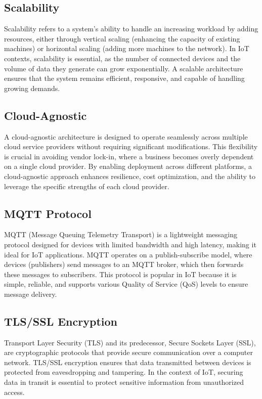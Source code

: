 \subsection*{Scalability}
\label{sec:scalability}
Scalability refers to a system's ability to handle an increasing workload by adding resources, either through vertical scaling (enhancing the capacity of existing machines) or horizontal scaling (adding more machines to the network). In IoT contexts, scalability is essential, as the number of connected devices and the volume of data they generate can grow exponentially. A scalable architecture ensures that the system remains efficient, responsive, and capable of handling growing demands.

\subsection*{Cloud-Agnostic}
\label{sec:cloud-agnostic}
A cloud-agnostic architecture is designed to operate seamlessly across multiple cloud service providers without requiring significant modifications. This flexibility is crucial in avoiding vendor lock-in, where a business becomes overly dependent on a single cloud provider. By enabling deployment across different platforms, a cloud-agnostic approach enhances resilience, cost optimization, and the ability to leverage the specific strengths of each cloud provider.

\subsection*{MQTT Protocol}
\label{sec:mqtt-protocol}
MQTT (Message Queuing Telemetry Transport) is a lightweight messaging protocol designed for devices with limited bandwidth and high latency, making it ideal for IoT applications. MQTT operates on a publish-subscribe model, where devices (publishers) send messages to an MQTT broker, which then forwards these messages to subscribers. This protocol is popular in IoT because it is simple, reliable, and supports various Quality of Service (QoS) levels to ensure message delivery.

\subsection*{TLS/SSL Encryption}
\label{sec:tls-ssl-encryption}
Transport Layer Security (TLS) and its predecessor, Secure Sockets Layer (SSL), are cryptographic protocols that provide secure communication over a computer network. TLS/SSL encryption ensures that data transmitted between devices is protected from eavesdropping and tampering. In the context of IoT, securing data in transit is essential to protect sensitive information from unauthorized access.

